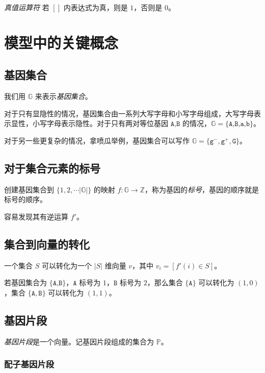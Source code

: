 \documentclass{article}
\begin{document}
\textsl{真值运算符} \qquad 若 $[]$ 内表达式为真，则是 $1$，否则是 $0$。

\section{模型中的关键概念}

\cite{2009陈阅增普通生物学}

\subsection{基因集合}

我们用 $\mathbb{G}$ 来表示\textsl{基因集合}。

对于只有显隐性的情况，基因集合由一系列大写字母和小写字母组成，大写字母表示显性，小写字母表示隐性。对于只有两对等位基因 $\texttt{A,B}$ 的情况，$\mathbb{G}=\{\texttt{A,B,a,b}\}$。

对于另一些更复杂的情况，拿喷瓜举例，基因集合可以写作 $\mathbb{G}=\{\texttt{g}^{-},\texttt{g}^{+},\texttt{G}\}$。

\subsection{对于集合元素的标号}

创建基因集合到 $\{1,2,\cdots |\mathbb{G}|\}$ 的映射 $f:\mathbb{G} \to \mathbb{Z}$，称为基因的\textsl{标号}，基因的顺序就是标号的顺序。

容易发现其有逆运算 $f'$。

\subsection{集合到向量的转化}

一个集合 $S$ 可以转化为一个 $|S|$ 维向量 $v$，其中 $v_i=[f'(i) \in S]$。

若基因集合为 $\{\texttt{A,B}\}$，$\texttt{A}$ 标号为 $1$，$\texttt{B}$ 标号为 $2$，那么集合 $\{\texttt{A}\}$ 可以转化为 $(1,0)$，集合 $\{\texttt{A},\texttt{B}\}$ 可以转化为 $(1,1)$。

\subsection{基因片段}

\textsl{基因片段}是一个向量。记基因片段组成的集合为 $\mathbb{P}$。

\subsubsection*{配子基因片段}
\end{document}
